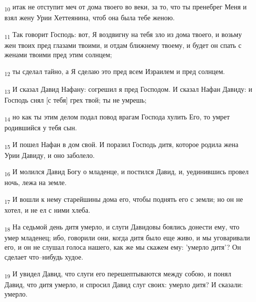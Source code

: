 \begin{tcolorbox}
\textsubscript{10} итак не отступит меч от дома твоего во веки, за то, что ты пренебрег Меня и взял жену Урии Хеттеянина, чтоб она была тебе женою.
\end{tcolorbox}
\begin{tcolorbox}
\textsubscript{11} Так говорит Господь: вот, Я воздвигну на тебя зло из дома твоего, и возьму жен твоих пред глазами твоими, и отдам ближнему твоему, и будет он спать с женами твоими пред этим солнцем;
\end{tcolorbox}
\begin{tcolorbox}
\textsubscript{12} ты сделал тайно, а Я сделаю это пред всем Израилем и пред солнцем.
\end{tcolorbox}
\begin{tcolorbox}
\textsubscript{13} И сказал Давид Нафану: согрешил я пред Господом. И сказал Нафан Давиду: и Господь снял [с тебя] грех твой; ты не умрешь;
\end{tcolorbox}
\begin{tcolorbox}
\textsubscript{14} но как ты этим делом подал повод врагам Господа хулить Его, то умрет родившийся у тебя сын.
\end{tcolorbox}
\begin{tcolorbox}
\textsubscript{15} И пошел Нафан в дом свой. И поразил Господь дитя, которое родила жена Урии Давиду, и оно заболело.
\end{tcolorbox}
\begin{tcolorbox}
\textsubscript{16} И молился Давид Богу о младенце, и постился Давид, и, уединившись провел ночь, лежа на земле.
\end{tcolorbox}
\begin{tcolorbox}
\textsubscript{17} И вошли к нему старейшины дома его, чтобы поднять его с земли; но он не хотел, и не ел с ними хлеба.
\end{tcolorbox}
\begin{tcolorbox}
\textsubscript{18} На седьмой день дитя умерло, и слуги Давидовы боялись донести ему, что умер младенец; ибо, говорили они, когда дитя было еще живо, и мы уговаривали его, и он не слушал голоса нашего, как же мы скажем ему: 'умерло дитя'? Он сделает что--нибудь худое.
\end{tcolorbox}
\begin{tcolorbox}
\textsubscript{19} И увидел Давид, что слуги его перешептываются между собою, и понял Давид, что дитя умерло, и спросил Давид слуг своих: умерло дитя? И сказали: умерло.
\end{tcolorbox}
